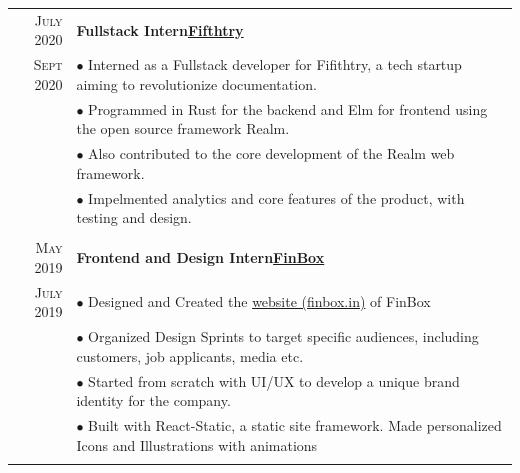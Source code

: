 \documentclass[a4paper,12pt]{extarticle} %
\let\oldtextbf\textbf
\renewcommand{\textbf}[1]{\textcolor{bold}{\oldtextbf{#1}}}
\begin{document}
\begin{tabularx}{\linewidth}{ r | X }

  \textsc{July 2020} & \textbf{Fullstack Intern}\hfill\textbf{\href{https://fifthtry.com/}{Fifthtry}}                                          \\
  \textsc{Sept 2020} & {$\bullet$ Interned as a Fullstack developer for Fifithtry, a tech startup aiming to revolutionize documentation.}      \\
                     & {$\bullet$ Programmed in Rust for the backend and Elm for frontend using the open source framework Realm.}              \\
                     & {$\bullet$ Also contributed to the core development of the Realm web framework.}                                        \\

                     & {$\bullet$ Impelmented analytics and core features of the product, with testing and design.}                            \\

  \multicolumn{2}{c}{}                                                                                                                         \\

  \textsc{May 2019}  & \textbf{Frontend and Design Intern}\hfill\textbf{\href{https://finbox.in/}{FinBox}}                                     \\
  \textsc{July 2019} & {$\bullet$ Designed and Created the \href{https://finbox.in/}{website (finbox.in)} of FinBox}                           \\
                     & {$\bullet$ Organized Design Sprints to target specific audiences, including customers, job applicants, media etc.
    }                                                                                                                                          \\
                     & {$\bullet$ Started from scratch with UI/UX to develop a unique brand identity for the company.
    }                                                                                                                                          \\

                     & {$\bullet$ Built with React-Static, a static site framework. Made personalized Icons and Illustrations with animations} \\
  \multicolumn{2}{c}{}                                                                                                                         \\


\end{tabularx}
\end{document}
